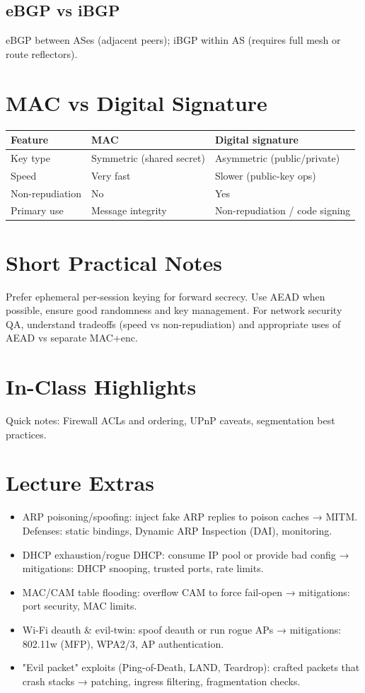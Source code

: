 \documentclass[11pt]{article}
\begin{document}
\subsection{eBGP vs iBGP}
 eBGP between ASes (adjacent peers); iBGP within AS (requires full mesh or route reflectors).

\section{MAC vs Digital Signature}
\begin{tabular}{l l l}
\toprule
Feature & MAC & Digital signature \\
\midrule
Key type & Symmetric (shared secret) & Asymmetric (public/private) \\
Speed & Very fast & Slower (public-key ops) \\
Non-repudiation & No & Yes \\
Primary use & Message integrity & Non-repudiation / code signing \\
\bottomrule
\end{tabular}

\section{Short Practical Notes}
Prefer ephemeral per-session keying for forward secrecy. Use AEAD when possible, ensure good randomness and key management. For network security QA, understand tradeoffs (speed vs non-repudiation) and appropriate uses of AEAD vs separate MAC+enc.

\section{In-Class Highlights}
Quick notes: Firewall ACLs and ordering, UPnP caveats, segmentation best practices.

\section{Lecture Extras}
\begin{itemize}
  \item ARP poisoning/spoofing: inject fake ARP replies to poison caches → MITM. Defenses: static bindings, Dynamic ARP Inspection (DAI), monitoring.
  \item DHCP exhaustion/rogue DHCP: consume IP pool or provide bad config → mitigations: DHCP snooping, trusted ports, rate limits.
  \item MAC/CAM table flooding: overflow CAM to force fail-open → mitigations: port security, MAC limits.
  \item Wi‑Fi deauth & evil‑twin: spoof deauth or run rogue APs → mitigations: 802.11w (MFP), WPA2/3, AP authentication.
  \item "Evil packet" exploits (Ping-of-Death, LAND, Teardrop): crafted packets that crash stacks → patching, ingress filtering, fragmentation checks.
\end{itemize}
\end{document}

